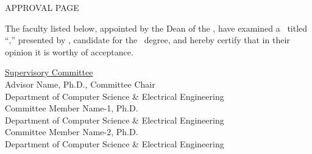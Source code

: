 
\begin{center}
   \MakeUppercase{Approval Page}
\end{center}
 \setlength{\baselineskip}{24pt}
The faculty listed below, appointed by the Dean of the \MyUMKCSchool,
 have examined a \MakeLowercase{\ThesisOrDissertation}\ titled
``\MyThesisTitle,''
presented by \MyName, candidate
for the \MyDegree\ degree, and hereby certify that in
their opinion it is worthy of acceptance.

\vspace{0.3in}
\setlength{\baselineskip}{5pt}

\begin{center}
\underline{Supervisory Committee}\\
\vspace{0.25in}
Advisor Name, Ph.D., Committee Chair\\
Department of Computer Science \& Electrical Engineering\\

\vspace{0.25in}
Committee Member Name-1, Ph.D.\\
Department of Computer Science \& Electrical Engineering\\
\vspace{0.25in}
Committee Member Name-2, Ph.D.\\
Department of Computer Science \& Electrical Engineering\\

\end{center}

\newpage
 \thispagestyle{empty}
